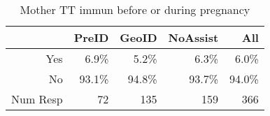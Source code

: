 \begin{table}[ht]
\centering
\begin{tabular}{rrrrr}
  \hline
 & PreID & GeoID & NoAssist & All \\ 
  \hline
Yes & 6.9\% & 5.2\% & 6.3\% & 6.0\% \\ 
  No & 93.1\% & 94.8\% & 93.7\% & 94.0\% \\ 
  Num Resp & 72 & 135 & 159 & 366 \\ 
   \hline
\end{tabular}
\caption{Mother TT immun before or during pregnancy} 
\end{table}

